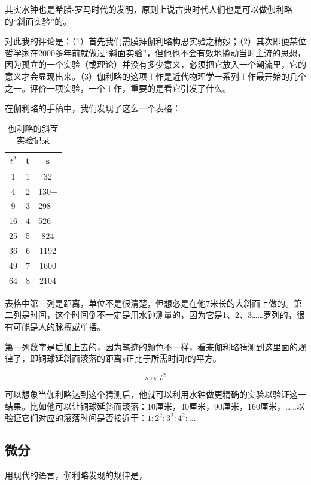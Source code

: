 其实水钟也是希腊-罗马时代的发明，原则上说古典时代人们也是可以做伽利略的“斜面实验”的。

对此我的评论是：（1）首先我们需膜拜伽利略构思实验之精妙；（2）其次即便某位哲学家在2000多年前就做过“斜面实验”，但他也不会有效地撬动当时主流的思想，因为孤立的一个实验（或理论）并没有多少意义，必须把它放入一个潮流里，它的意义才会显现出来。（3）伽利略的这项工作是近代物理学一系列工作最开始的几个之一。评价一项实验，一个工作，重要的是看它引发了什么。

在伽利略的手稿中，我们发现了这么一个表格：

\begin{table}[htdp]
\caption{伽利略的斜面实验记录}
\begin{center}
\begin{tabular}{|c|c|c|}
\hline
$t^2$ & t & s \\
\hline
1 & 1 & 32 \\
4 & 2 & 130+ \\
9 & 3 & 298+ \\
16 & 4 & 526+ \\
25 & 5 & 824 \\
36 & 6 & 1192 \\
49 & 7 & 1600 \\
64 & 8 & 2104 \\
\hline
\end{tabular}
\end{center}
\label{default}
\end{table}%

表格中第三列是距离，单位不是很清楚，但想必是在他7米长的大斜面上做的。第二列是时间，这个时间倒不一定是用水钟测量的，因为它是1、2、3……罗列的，很有可能是人的脉搏或单摆。

第一列数字是后加上去的，因为笔迹的颜色不一样，看来伽利略猜测到这里面的规律了，即铜球延斜面滚落的距离$s$正比于所需时间$t$的平方。

\begin{equation}
s \propto t^2
\end{equation}

可以想象当伽利略达到这个猜测后，他就可以利用水钟做更精确的实验以验证这一结果。比如他可以让铜球延斜面滚落：10厘米，40厘米，90厘米，160厘米，……以验证它们对应的滚落时间是否接近于：$1: 2^2: 3^2 : 4^2 : ...$

\subsection{微分}

用现代的语言，伽利略发现的规律是，

